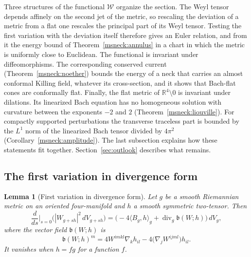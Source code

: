 \documentclass[11pt]{article}
\numberwithin{equation}{section}
\newtheorem{lemma}[theorem]{Lemma}
\theoremstyle{definition}
\theoremstyle{remark}
\begin{document}
Three structures of the functional \(\mathcal W\) organize the
section. The Weyl tensor depends affinely on the second jet of the
metric, so rescaling the deviation of a metric from a flat one rescales
the principal part of its Weyl tensor. Testing the first variation
with the deviation itself therefore gives an Euler relation, and from
it the energy bound of Theorem~\ref{msneck:annulus} in a chart in which
the metric is uniformly close to Euclidean. The functional is invariant
under diffeomorphisms. The corresponding conserved current
(Theorem~\ref{msneck:noether}) bounds the energy of a neck that carries
an almost conformal Killing field, whatever its cross-section, and it
shows that Bach-flat cones are conformally flat. Finally, the flat
metric of \(\mathbb R^4\setminus0\) is invariant under dilations. Its
linearized Bach equation has no homogeneous solution with curvature
between the exponents \(-2\) and \(2\) (Theorem~\ref{msneck:liouville}).
For compactly supported perturbations the transverse traceless part is
bounded by the \(L^1\) norm of the linearized Bach tensor divided by \(4\pi^2\)
(Corollary~\ref{msneck:amplitude}). The last subsection explains how
these statements fit together. Section~\ref{sec:outlook} describes
what remains.

\subsection{The first variation in divergence form}
\label{msneck:divergence}

\begin{lemma}[First variation in divergence form]
\label{msneck:first-variation}
Let \(g\) be a smooth Riemannian metric on an oriented four-manifold
and \(h\) a smooth symmetric two-tensor. Then
\begin{equation}\label{msneck:div-form}
 \frac{d}{ds}\Big|_{s=0}\bigl(|W_{g+sh}|^2\,dV_{g+sh}\bigr)
 =\bigl(-4\langle B_g,h\rangle_g+\operatorname{div}_g\mathfrak b(W;h)\bigr)
  \,dV_g,
\end{equation}
where the vector field \(\mathfrak b(W;h)\) is
\begin{equation}\label{msneck:boundary-form}
 \mathfrak b(W;h)^m=4W^{imkl}\nabla_kh_{il}
                   -4\bigl(\nabla_jW^{ijml}\bigr)h_{il}.
\end{equation}
It vanishes when \(h=fg\) for a function \(f\).
\end{lemma}
\end{document}
